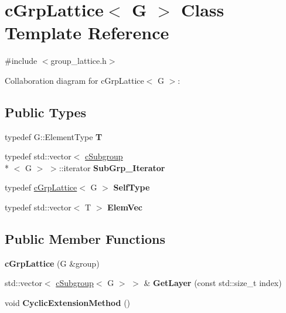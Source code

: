 \hypertarget{classcGrpLattice}{\section{c\-Grp\-Lattice$<$ G $>$ Class Template Reference}
\label{classcGrpLattice}
}


{\ttfamily \#include $<$group\-\_\-lattice.\-h$>$}



Collaboration diagram for c\-Grp\-Lattice$<$ G $>$\-:
\subsection*{Public Types}
\begin{DoxyCompactItemize}
\item 
\hypertarget{classcGrpLattice_adcd74a778419c1f515170d6f4eec0e46}{typedef G\-::\-Element\-Type {\bfseries T}}\label{classcGrpLattice_adcd74a778419c1f515170d6f4eec0e46}

\item 
\hypertarget{classcGrpLattice_a65bbb53481fb01fab29b56111e08a1a8}{typedef std\-::vector$<$ \hyperlink{classcSubgroup}{c\-Subgroup}\\*
$<$ G $>$ $>$\-::iterator {\bfseries Sub\-Grp\-\_\-\-Iterator}}\label{classcGrpLattice_a65bbb53481fb01fab29b56111e08a1a8}

\item 
\hypertarget{classcGrpLattice_a229b8231e9d4977673fcc629c083ed27}{typedef \hyperlink{classcGrpLattice}{c\-Grp\-Lattice}$<$ G $>$ {\bfseries Self\-Type}}\label{classcGrpLattice_a229b8231e9d4977673fcc629c083ed27}

\item 
\hypertarget{classcGrpLattice_ae5a1bef06325a01169039dfbbfcd279a}{typedef std\-::vector$<$ T $>$ {\bfseries Elem\-Vec}}\label{classcGrpLattice_ae5a1bef06325a01169039dfbbfcd279a}

\end{DoxyCompactItemize}
\subsection*{Public Member Functions}
\begin{DoxyCompactItemize}
\item 
\hypertarget{classcGrpLattice_a27f923e1817bed7d7d3b51a02d08bf76}{{\bfseries c\-Grp\-Lattice} (G \&group)}\label{classcGrpLattice_a27f923e1817bed7d7d3b51a02d08bf76}

\item 
\hypertarget{classcGrpLattice_a37b06de9e9bf5b647c524f000b054b6a}{std\-::vector$<$ \hyperlink{classcSubgroup}{c\-Subgroup}$<$ G $>$ $>$ \& {\bfseries Get\-Layer} (const std\-::size\-\_\-t index)}\label{classcGrpLattice_a37b06de9e9bf5b647c524f000b054b6a}

\item 
\hypertarget{classcGrpLattice_af05dbd664f73f60ea2e9bcef893da25b}{void {\bfseries Cyclic\-Extension\-Method} ()}\label{classcGrpLattice_af05dbd664f73f60ea2e9bcef893da25b}

\end{DoxyCompactItemize}
